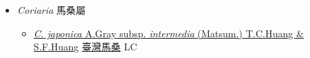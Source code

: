 
  \begin{itemize}
 \item[] \textit{Coriaria} 馬桑屬
                    
  \begin{itemize}
        \item[] \href{http://www.theplantlist.org/tpl1.1/search?q=Coriaria+japonica+subsp.+intermedia}{\textit{C. japonica} A.Gray subsp. \textit{intermedia} (Matsum.) T.C.Huang \& S.F.Huang}   \href{\detokenize{http://taibnet.sinica.edu.tw/chi/taibnet_species_list.php?T2=臺灣馬桑&T2_new_value=true&fr=y}}{臺灣馬桑} LC
  \end{itemize}
  \end{itemize}
